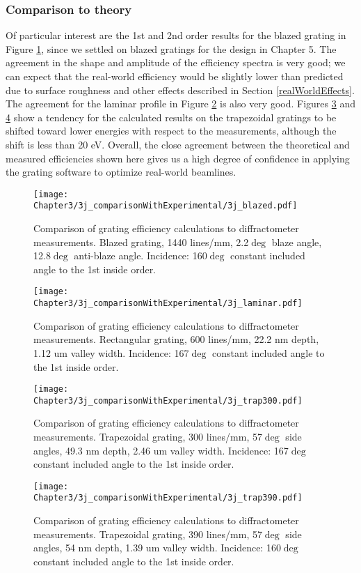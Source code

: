 \subsubsection{Comparison to theory}
Of particular interest are the 1st and 2nd order results for the blazed grating in Figure \ref{3j-1}, since we settled on blazed gratings for the design in Chapter 5.  The agreement in the shape and amplitude of the efficiency spectra is very good; we can expect that the real-world efficiency would be slightly lower than predicted due to surface roughness and other effects described in Section \ref{realWorldEffects}.  The agreement for the laminar profile in Figure \ref{3j-2} is also very good.  Figures \ref{3j-3} and \ref{3j-4} show a tendency for the calculated results on the trapezoidal gratings to be shifted toward lower energies with respect to the measurements, although the shift is less than 20 eV.  Overall, the close agreement between the theoretical and measured efficiencies shown here gives us a high degree of confidence in applying the grating software to optimize real-world beamlines.
 
\begin{figure}[htbp] %
   \centering
   \texttt{[image: Chapter3/3j\_comparisonWithExperimental/3j\_blazed.pdf]} 
   \caption{Comparison of grating efficiency calculations to diffractometer measurements.  Blazed grating, 1440 lines/mm, 2.2$\deg$ blaze angle, 12.8$\deg$ anti-blaze angle. Incidence: 160$\deg$ constant included angle to the 1st inside order.}
   \label{3j-1}
\end{figure}

\begin{figure}[htbp] %
   \centering
   \texttt{[image: Chapter3/3j\_comparisonWithExperimental/3j\_laminar.pdf]} 
   \caption{Comparison of grating efficiency calculations to diffractometer measurements.  Rectangular grating, 600 lines/mm, 22.2 nm depth, 1.12 um valley width.  Incidence: 167$\deg$ constant included angle to the 1st inside order.}
   \label{3j-2}
\end{figure}

\begin{figure}[htbp] %
   \centering
   \texttt{[image: Chapter3/3j\_comparisonWithExperimental/3j\_trap300.pdf]} 
   \caption{Comparison of grating efficiency calculations to diffractometer measurements.  Trapezoidal grating, 300 lines/mm, 57$\deg$ side angles, 49.3 nm depth, 2.46 um valley width.  Incidence: 167$\deg$ constant included angle to the 1st inside order.}
   \label{3j-3}
\end{figure}

\begin{figure}[htbp] %
   \centering
   \texttt{[image: Chapter3/3j\_comparisonWithExperimental/3j\_trap390.pdf]} 
   \caption{Comparison of grating efficiency calculations to diffractometer measurements.  Trapezoidal grating, 390 lines/mm, 57$\deg$ side angles, 54 nm depth, 1.39 um valley width.  Incidence: 160$\deg$ constant included angle to the 1st inside order.}
   \label{3j-4}
\end{figure}
